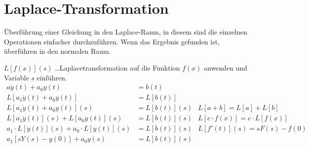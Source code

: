 \documentclass[%
	paper=a4,%
	pagesize=auto	%
	]{scrartcl}
\begin{document}
\section{Laplace-Transformation}
	Überführung einer Gleichung in den Laplace-Raum, in diesem
	sind die einzelnen Operationen einfacher durchzuführen.
	Wenn das Ergebnis gefunden ist, überführen in den normalen Raum.

	\(L\left[f(x)\right](s)\) \dots Laplacetransformation auf die
	Funktion \(f(x)\) anwenden und  Variable \(s\) einführen.
\begin{align*}
	a \dot y(t) + a_0 y(t) & = b(t)\\
	L\left[a_1 \dot y(t) + a_0 y(t)\right]
		& = L\left[b(t)\right]\\
	L\left[a_1 \dot y(t) + a_0 y(t)\right](s)
		& = L\left[b(t)\right](s)
		& L\left[a+b\right] = L\left[a\right] + L\left[b\right]\\
	L\left[a_1 \dot y(t)\right](s) + L\left[a_0 y(t)\right](s)
		& = L\left[b(t)\right](s)
		& L\left[c \cdot f(x)\right] = c \cdot L\left[f(x)\right]\\
	a_1  \cdot L\left[\dot y(t)\right](s) + a_0  \cdot L\left[y(t)\right](s)
		& = L\left[b(t)\right](s)
		& L\left[ f'(t) \right](s) = sF(s) - f(0)\\
	a_1 \left[s Y(s) - y(0)\right] + a_0 y(s)
		& = L\left[b(t)\right](s)
\end{align*}
\end{document}
